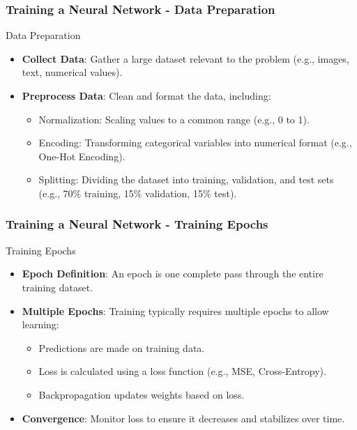 \documentclass[aspectratio=169]{beamer}
\begin{document}
\begin{frame}[fragile]
    \frametitle{Training a Neural Network - Data Preparation}
    \begin{block}{Data Preparation}
        \begin{itemize}
            \item \textbf{Collect Data}: Gather a large dataset relevant to the problem (e.g., images, text, numerical values).
            \item \textbf{Preprocess Data}: Clean and format the data, including:
                \begin{itemize}
                    \item Normalization: Scaling values to a common range (e.g., 0 to 1).
                    \item Encoding: Transforming categorical variables into numerical format (e.g., One-Hot Encoding).
                    \item Splitting: Dividing the dataset into training, validation, and test sets (e.g., 70\% training, 15\% validation, 15\% test).
                \end{itemize}
        \end{itemize}
    \end{block}
\end{frame}

\begin{frame}[fragile]
    \frametitle{Training a Neural Network - Training Epochs}
    \begin{block}{Training Epochs}
        \begin{itemize}
            \item \textbf{Epoch Definition}: An epoch is one complete pass through the entire training dataset.
            \item \textbf{Multiple Epochs}: Training typically requires multiple epochs to allow learning:
                \begin{itemize}
                    \item Predictions are made on training data.
                    \item Loss is calculated using a loss function (e.g., MSE, Cross-Entropy).
                    \item Backpropagation updates weights based on loss.
                \end{itemize}
            \item \textbf{Convergence}: Monitor loss to ensure it decreases and stabilizes over time.
        \end{itemize}
    \end{block}
\end{frame}
\end{document}
